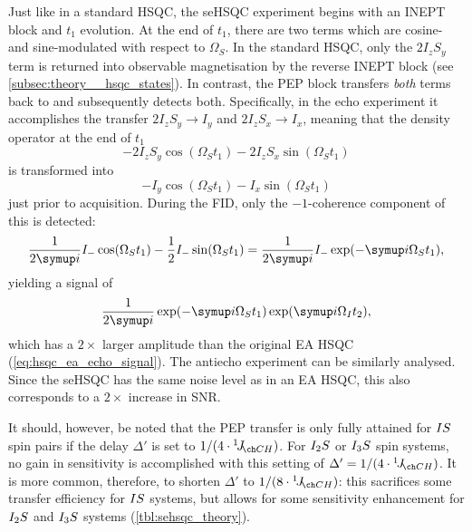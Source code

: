 Just like in a standard HSQC, the seHSQC experiment begins with an INEPT block and $t_1$ evolution.
At the end of $t_1$, there are two terms which are cosine- and sine-modulated with respect to $\Omega_S$.
In the standard HSQC, only the $2I_zS_y$ term is returned into observable \proton{} magnetisation by the reverse INEPT block (see \cref{subsec:theory__hsqc_states}).
In contrast, the PEP block transfers \textit{both} terms back to \proton{} and subsequently detects both.
Specifically, in the echo experiment it accomplishes the transfer $2I_zS_y \to I_y$ and $2I_zS_x \to I_x$, meaning that the density operator at the end of $t_1$
\begin{equation}
    \label{eq:sehsqc_t1_modulation}
    -2I_zS_y \cos(\Omega_S t_1) - 2I_zS_x \sin(\Omega_S t_1)
\end{equation}
is transformed into
\begin{equation}
    \label{eq:sehsqc_before_detection}
    -I_y \cos(\Omega_S t_1) - I_x \sin(\Omega_S t_1)
\end{equation}
just prior to acquisition.
During the FID, only the $-1$-coherence component of this is detected:
\begin{equation}
    \label{eq:sehsqc_detection_minusone}
    \frac{1}{2\mi}I_- \cos(\Omega_S t_1) - \frac{1}{2}I_- \sin(\Omega_S t_1) = \frac{1}{2\mi}I_-\exp(-\mi \Omega_S t_1),
\end{equation}
yielding a signal of
\begin{equation}
    \label{eq:s_echo_sehsqc}
    \frac{1}{2\mi}\exp(-\mi \Omega_S t_1)\exp(\mi \Omega_I t_2),
\end{equation}
which has a $2\times$ larger amplitude than the original EA HSQC (\cref{eq:hsqc_ea_echo_signal}).
The antiecho experiment can be similarly analysed.
Since the seHSQC has the same noise level as in an EA HSQC, this also corresponds to a $2\times$ increase in SNR.

It should, however, be noted that the PEP transfer is only fully attained for $IS\/$ spin pairs if the delay $\Delta'$ is set to $1 / (4 \cdot \oneJ{CH})$.
For $I_2S\/$ or $I_3\/S$ spin systems, no gain in sensitivity is accomplished with this setting of $\Delta' = 1 / (4 \cdot \oneJ{CH})$.
It is more common, therefore, to shorten $\Delta'$ to $1 / (8 \cdot \oneJ{CH})$: this sacrifices some transfer efficiency for $IS\/$ systems, but allows for some sensitivity enhancement for $I_2S\/$ and $I_3S\/$ systems (\cref{tbl:sehsqc_theory}).

